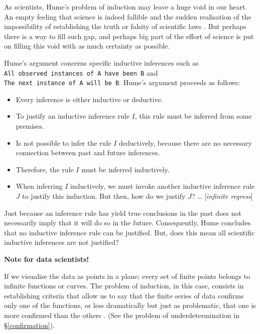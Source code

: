 \documentclass[
]{book}
\providecommand{\tightlist}{%
  \setlength{\itemsep}{0pt}\setlength{\parskip}{0pt}}
\begin{document}
As scientists, Hume's problem of induction may leave a huge void in our heart. An empty feeling that science is indeed fallible and the sudden realisation of the impossibility of establishing the truth or falsity of scientific laws \citep{rosenberg2019philosophy}. But perhaps there is a way to fill such gap, and perhaps big part of the effort of science is put on filling this void with as much certainty as possible.

Hume's argument concerns specific inductive inferences such as \texttt{All\ observed\ instances\ of\ A\ have\ been\ B} and \texttt{The\ next\ instance\ of\ A\ will\ be\ B}. Hume's argument proceeds as follows:

\begin{itemize}
\tightlist
\item
  Every inference is either inductive or deductive.
\item
  To justify an inductive inference rule \(I\), this rule must be inferred from some premises.
\item
  Is not possible to infer the rule \(I\) deductively, because there are no necessary connection between past and future inferences.
\item
  Therefore, the rule \(I\) must be inferred inductively.
\item
  When inferring \(I\) inductively, we must invoke another inductive inference rule \(J\) to justify this induction. But then, how do we justify \(J\)? \ldots{} {[}\emph{infinite regress}{]}
\end{itemize}

Just because an inference rule has yield true conclusions in the past does not necessarily imply that it will do so in the future.
Consequently, Hume concludes that no inductive inference rule can be justified. But, does this mean all scientific inductive inferences are not justified?

\begin{tipbox}

\textbf{Note for data scientists!}

If we visualise the data as points in a plane; every set of finite points belongs to infinite functions or curves. The problem of induction, in this case, consists in establishing criteria that allow us to say that the finite series of data confirms only one of the functions, or less dramatically but just as problematic, that one is more confirmed than the others \citep{diez1997fundamentos}. (See the problem of underdetermination in §\ref{confirmation}).

\end{tipbox}
\end{document}
